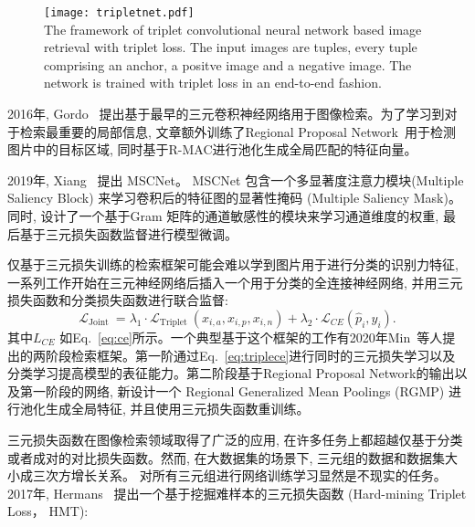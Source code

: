 \begin{figure}[!htp]
    \centering
    \texttt{[image: tripletnet.pdf]} \\
      {The framework of triplet convolutional neural network based image retrieval with triplet loss. The input images are tuples, every tuple comprising an anchor, a positve image and a negative image. The network is trained with triplet loss in an end-to-end fashion.}
   \label{fig:tripletnet}
\end{figure}
2016年, Gordo~\cite{gordo2016deep, gordo2017end} 提出基于最早的三元卷积神经网络用于图像检索。为了学习到对于检索最重要的局部信息, 文章额外训练了Regional Proposal Network~\cite{ren2015faster}用于检测图片中的目标区域, 同时基于R-MAC进行池化生成全局匹配的特征向量。\par
2019年, Xiang~\cite{xiang2019multiple} 提出 MSCNet。 MSCNet 包含一个多显著度注意力模块(Multiple Saliency Block) 来学习卷积后的特征图的显著性掩码 (Multiple Saliency Mask)。同时, 设计了一个基于Gram 矩阵的通道敏感性的模块来学习通道维度的权重, 最后基于三元损失函数监督进行模型微调。\par
仅基于三元损失训练的检索框架可能会难以学到图片用于进行分类的识别力特征, 一系列工作开始在三元神经网络后插入一个用于分类的全连接神经网络, 并用三元损失函数和分类损失函数进行联合监督:
\begin{equation}
    \mathcal{L}_{\text {Joint }}=\lambda_1 \cdot \mathcal{L}_{\text {Triplet }}\left(x_{i, a}, x_{i, p}, x_{i, n}\right)+\lambda_2 \cdot \mathcal{L}_{C E}\left(\hat{p}_i, y_i\right).
    \label{eq:triplece}
\end{equation}
其中$L_{CE}$ 如Eq.~\ref{eq:ce}所示。一个典型基于这个框架的工作有2020年Min~\cite{min2020two}等人提出的两阶段检索框架。第一阶通过Eq.~\ref{eq:triplece}进行同时的三元损失学习以及分类学习提高模型的表征能力。第二阶段基于Regional Proposal Network的输出以及第一阶段的网络, 新设计一个 Regional Generalized Mean Poolings (RGMP) 进行池化生成全局特征, 并且使用三元损失函数重训练。\par
三元损失函数在图像检索领域取得了广泛的应用, 在许多任务上都超越仅基于分类或者成对的对比损失函数。然而, 在大数据集的场景下, 三元组的数据和数据集大小成三次方增长关系。 对所有三元组进行网络训练学习显然是不现实的任务。 2017年, Hermans~\cite{hermans2017defense} 提出一个基于挖掘难样本的三元损失函数 (Hard-mining Triplet Loss， HMT):
